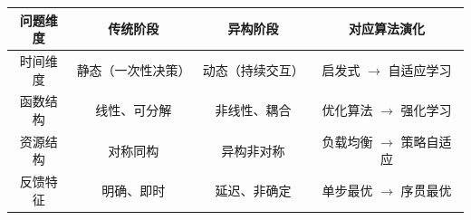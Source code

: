 \begin{tabular}{cccc}
\hline
问题维度 & 传统阶段 & 异构阶段 & 对应算法演化 \\
\hline
时间维度 & 静态（一次性决策） & 动态（持续交互） & 启发式 $\rightarrow$ 自适应学习 \\
函数结构 & 线性、可分解 & 非线性、耦合 & 优化算法 $\rightarrow$ 强化学习 \\
资源结构 & 对称同构 & 异构非对称 & 负载均衡 $\rightarrow$ 策略自适应 \\
反馈特征 & 明确、即时 & 延迟、非确定 & 单步最优 $\rightarrow$ 序贯最优 \\
\hline
\end{tabular}